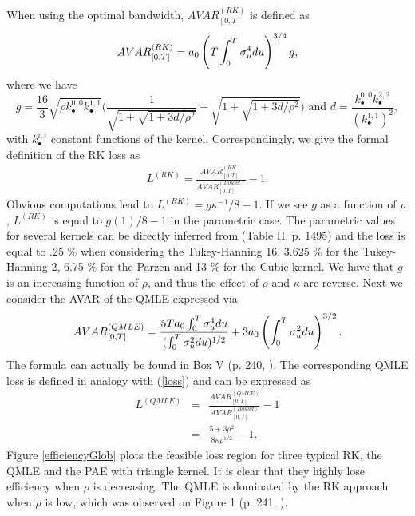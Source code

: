 \documentclass[11pt]{article}
\numberwithin{equation}{section}
\theoremstyle{plain}
\theoremstyle{remark}
\begin{document}
\smallskip
When using the optimal bandwidth, $AVAR_{[0,T]}^{(RK)}$ is defined as
\begin{eqnarray*}
AVAR_{[0,T]}^{(RK)} = a_0 \left( T \int_0^T \sigma_u^4 du \right)^{3/4} g,
\end{eqnarray*}
where we have 
$$g = \frac{16}{3} \sqrt{\rho k_{\bullet}^{0,0} k_{\bullet}^{1,1}} \bigg( \frac{1}{\sqrt{1 + \sqrt{1 + 3 d / \rho^2}}} + \sqrt{1 + \sqrt{1 + 3 d / \rho^2}} \bigg) \text{ and } d = \frac{k_{\bullet}^{0,0} k_{\bullet}^{2,2}}{ (k_{\bullet}^{1,1})^2},$$
with $k_{\bullet}^{i,i}$ constant functions of the kernel. Correspondingly, we give the formal definition of the RK loss as
\begin{eqnarray}
\label{loss}
L^{(RK)} = \frac{AVAR_{[0,T]}^{(RK)}}{AVAR_{[0,T]}^{(Bound)}} - 1.
\end{eqnarray}
Obvious computations lead to $L^{(RK)} = g \kappa^{-1} /8 -1$. If we see $g$ as a function of $\rho$, $L^{(RK)}$ is equal to $g(1)/8 - 1$  in the parametric case. The parametric values for several kernels can be directly inferred from \cite{barndorff2008designing} (Table II, p. 1495) and the loss is equal to .25 \% when considering the Tukey-Hanning 16, 3.625 \% for the Tukey-Hanning 2, 6.75 \% for the Parzen and 13 \% for the Cubic kernel. We have that $g$ is an increasing function of $\rho$, and thus the effect of $\rho$ and $\kappa$ are reverse. Next we consider the AVAR of the QMLE expressed via 
$$AVAR_{[0,T]}^{(QMLE)} = \frac{5 T a_0 \int_0^T \sigma_u^4 du}{( \int_0^T \sigma_u^2 du)^{1/2}} + 3 a_0 \left(\int_0^T \sigma_u^2 du \right)^{3/2}.$$
The formula can actually be found in Box V (p. 240, \cite{xiu2010quasi}). The corresponding QMLE loss is defined in analogy with (\ref{loss}) and can be expressed as
\begin{eqnarray*}
L^{(QMLE)} & = & \frac{AVAR_{[0,T]}^{(QMLE)}}{AVAR_{[0,T]}^{(Bound)}} - 1\\
& = & \frac{5+3 \rho^2}{8 \kappa \rho^{1/2}} - 1.
\end{eqnarray*}
Figure \ref{efficiencyGlob} plots the feasible loss region for three typical RK, the QMLE and the PAE with triangle kernel. It is clear that they highly lose efficiency when $\rho$ is decreasing. The QMLE is dominated by the RK approach when $\rho$ is low, which was observed on Figure 1 (p. 241, \cite{xiu2010quasi}).
\end{document}
